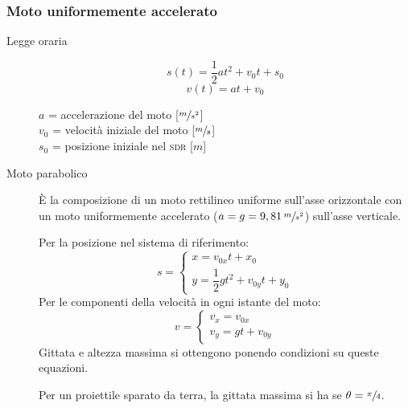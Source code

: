 \documentclass[a4paper,11pt,italian]{article}
\begin{document}
\subsubsection{Moto uniformemente accelerato}
\begin{description}
  \item[Legge oraria] 
  \[ s(t) = \frac{1}{2} a t^2 + v_0 t + s_0 \] 
  \[ v(t) = at + v_0 \]
  \begin{multicols}{2}
  $ a $ = accelerazione del moto [$ \sfrac{m}{s^2} $]\\
  $ v_0 $ = velocità iniziale del moto [$ \sfrac{m}{s} $]\\
  $ s_0 $ = posizione iniziale nel \textsc{sdr} [$ m $]
  \end{multicols}
  
  \item[Moto parabolico] 
  È la composizione di un moto rettilineo uniforme sull'asse orizzontale con un moto uniformemente accelerato ($ a=g=9,81 \, \sfrac{m}{s^2} $) sull'asse verticale.
  
  Per la posizione nel sistema di riferimento:
  \[ s= 
  \left\{ 
  \begin{array}{l}
  x = v_{0x}t + x_0 \\ 
  y = \dfrac{1}{2}gt^2 + v_{0y}t + y_0
  \end{array}
  \right.
  \]
Per le componenti della velocità in ogni istante del moto:
  \[ v=
  \left\{ 
  \begin{array}{l}
  v_x = v_{0x} \\ 
  v_y = gt + v_{0y}
  \end{array}
  \right.
  \]
Gittata e altezza massima si ottengono ponendo condizioni su queste equazioni.

Per un proiettile sparato da terra, la gittata massima si ha se $ \theta = \sfrac{\pi}{4} $.

\end{description}
\end{document}
